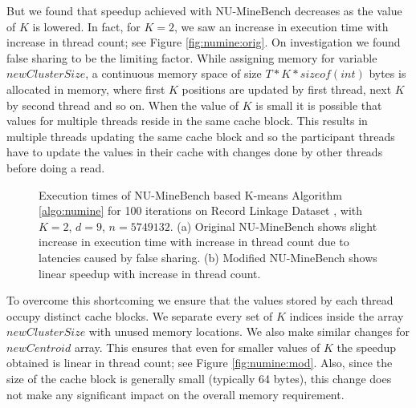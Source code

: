 But we found that speedup achieved with NU-MineBench decreases as the value of $K$ is lowered. In fact, for $K = 2$, we saw an increase in execution time with increase in thread count; see Figure \ref{fig:numine:orig}. On investigation we found false sharing to be the limiting factor. While assigning memory for variable $newClusterSize$, a continuous memory space of size $T*K*sizeof(int)$ bytes is allocated in memory, where first $K$ positions are updated by first thread, next $K$ by second thread and so on. When the value of $K$ is small it is possible that values for multiple threads reside in the same cache block. This results in multiple threads updating the same cache block and so the participant threads have to update the values in their cache with changes done by other threads before doing a read.

\begin{figure}[h]
	\centerline{
	}
	\caption{Execution times of NU-MineBench based K-means Algorithm \ref{algo:numine} for 100 iterations on Record Linkage Dataset \cite{recordLinkage}, with $K = 2$, $d = 9$, $n = 5749132$. (a) Original NU-MineBench shows slight increase in execution time with increase in thread count due to latencies caused by false sharing. (b) Modified NU-MineBench shows linear speedup with increase in thread count.}
\label{fig:kmean}
\end{figure}


To overcome this shortcoming we ensure that the values stored by each thread occupy distinct cache blocks. We separate every set of $K$ indices inside the array $newClusterSize$ with unused memory locations. We also make similar changes for $newCentroid$ array. This ensures that even for smaller values of $K$ the speedup obtained is linear in thread count; see Figure \ref{fig:numine:mod}. Also, since the size of the cache block is generally small (typically 64 bytes), this change does not make any significant impact on the overall memory requirement.
